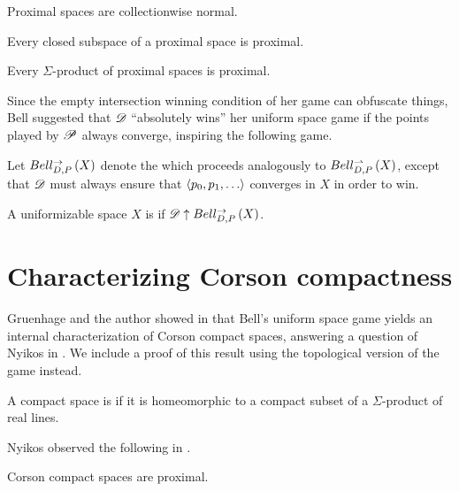 \begin{thm}
  Proximal spaces are collectionwise normal.
\end{thm}

\begin{thm}
  Every closed subspace of a proximal space is proximal.
\end{thm}

\begin{thm}
  Every $\Sigma$-product of proximal spaces is proximal.
\end{thm}

Since the empty intersection winning condition of her game can obfuscate things,
Bell suggested that $\mathscr{D}$ ``absolutely wins'' her uniform space game
if the points played by $\mathscr{P}$ always converge, inspiring the following game.

\begin{defn}
  Let $Bell_{D,P}^{\to}\left({X}\right)$ denote the
   which
  proceeds analogously to $Bell_{D,P}^{\rightharpoonup}\left({X}\right)$, except
  that $\mathscr{D}$ must always ensure that $\<p_0,p_1,\dots\>$ converges
  in $X$ in order to win.
\end{defn}

\begin{defn}
  A uniformizable space $X$ is  if
  $\mathscr{D} \uparrow Bell_{D,P}^{\to}\left({X}\right)$.
\end{defn}



\section{Characterizing Corson compactness}

Gruenhage and the author showed in \cite{MR3227201} that Bell's uniform space
game yields an internal characterization of Corson compact spaces, answering
a question of Nyikos in \cite{nyikosProximalPreprint}. We include a proof
of this result using the topological version of the game instead.

\begin{defn}
  A compact space is  if it is homeomorphic to a compact
  subset of a $\Sigma$-product of real lines.
\end{defn}

Nyikos observed the following in \cite{nyikosProximalPreprint}.

\begin{prop}
  Corson compact spaces are proximal.
\end{prop}

